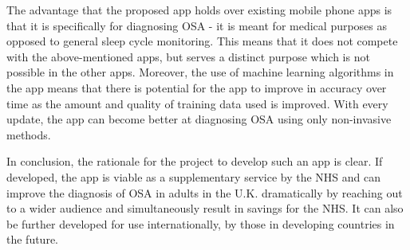 The advantage that the proposed app holds over existing mobile phone apps is that it is specifically for diagnosing OSA - it is meant for medical purposes as opposed to general sleep cycle monitoring. This means that it does not compete with the above-mentioned apps, but serves a distinct purpose which is not possible in the other apps. Moreover, the use of machine learning algorithms in the app means that there is potential for the app to improve in accuracy over time as the amount and quality of training data used is improved. With every update, the app can become better at diagnosing OSA using only non-invasive methods.

In conclusion, the rationale for the project to develop such an app is clear. If developed, the app is viable as a supplementary service by the NHS and can improve the diagnosis of OSA in adults in the U.K. dramatically by reaching out to a wider audience and simultaneously result in savings for the NHS. It can also be further developed for use internationally, by those in developing countries in the future.
